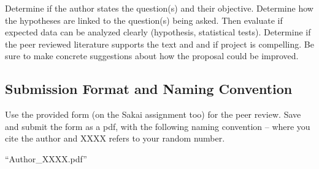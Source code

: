 \documentclass{tufte-handout}\usepackage[]{graphicx}\usepackage[]{color}
\begin{document}
Determine if the author states the question(s) and their objective. Determine how the hypotheses are linked to the question(s) being asked. Then evaluate if expected data can be analyzed clearly (hypothesis, statistical tests). Determine if the peer reviewed literature supports the text and and if project is compelling. Be sure to make concrete suggestions about how the proposal could be improved. 

\subsection{Submission Format and Naming Convention}

Use the provided form (on the Sakai assignment too) for the peer review. Save and submit the form as a pdf, with the following naming convention -- where you cite the author and XXXX refers to your random number.

\smallskip
\begin{center}
\noindent ``Author\_XXXX.pdf''
\end{center}
\bigskip



\end{document}
